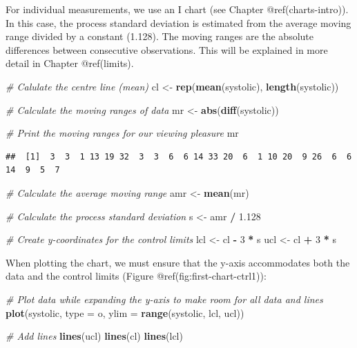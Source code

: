 \documentclass[
]{book}
\newenvironment{Shaded}{\begin{snugshade}}{\end{snugshade}}
\newcommand{\AttributeTok}[1]{\textcolor[rgb]{0.13,0.29,0.53}{#1}}
\newcommand{\CommentTok}[1]{\textcolor[rgb]{0.56,0.35,0.01}{\textit{#1}}}
\newcommand{\DecValTok}[1]{\textcolor[rgb]{0.00,0.00,0.81}{#1}}
\newcommand{\FloatTok}[1]{\textcolor[rgb]{0.00,0.00,0.81}{#1}}
\newcommand{\FunctionTok}[1]{\textcolor[rgb]{0.13,0.29,0.53}{\textbf{#1}}}
\newcommand{\NormalTok}[1]{#1}
\newcommand{\OtherTok}[1]{\textcolor[rgb]{0.56,0.35,0.01}{#1}}
\newcommand{\SpecialCharTok}[1]{\textcolor[rgb]{0.81,0.36,0.00}{\textbf{#1}}}
\newcommand{\StringTok}[1]{\textcolor[rgb]{0.31,0.60,0.02}{#1}}
\begin{document}
For individual measurements, we use an I chart (see Chapter
@ref(charts-intro)). In this case, the process standard deviation is
estimated from the average moving range divided by a constant (1.128).
The moving ranges are the absolute differences between consecutive
observations. This will be explained in more detail in Chapter
@ref(limits).

\begin{Shaded}
\begin{Highlighting}[]
\CommentTok{\# Calulate the centre line (mean)}
\NormalTok{cl  }\OtherTok{\textless{}{-}} \FunctionTok{rep}\NormalTok{(}\FunctionTok{mean}\NormalTok{(systolic), }\FunctionTok{length}\NormalTok{(systolic))}

\CommentTok{\# Calculate the moving ranges of data}
\NormalTok{mr }\OtherTok{\textless{}{-}} \FunctionTok{abs}\NormalTok{(}\FunctionTok{diff}\NormalTok{(systolic))}

\CommentTok{\# Print the moving ranges for our viewing pleasure}
\NormalTok{mr}
\end{Highlighting}
\end{Shaded}

\begin{verbatim}
##  [1]  3  3  1 13 19 32  3  3  6  6 14 33 20  6  1 10 20  9 26  6  6 14  9  5  7
\end{verbatim}

\begin{Shaded}
\begin{Highlighting}[]
\CommentTok{\# Calculate the average moving range}
\NormalTok{amr }\OtherTok{\textless{}{-}} \FunctionTok{mean}\NormalTok{(mr)}

\CommentTok{\# Calculate the process standard deviation}
\NormalTok{s }\OtherTok{\textless{}{-}}\NormalTok{ amr }\SpecialCharTok{/} \FloatTok{1.128}

\CommentTok{\# Create y{-}coordinates for the control limits}
\NormalTok{lcl }\OtherTok{\textless{}{-}}\NormalTok{ cl }\SpecialCharTok{{-}} \DecValTok{3} \SpecialCharTok{*}\NormalTok{ s}
\NormalTok{ucl }\OtherTok{\textless{}{-}}\NormalTok{ cl }\SpecialCharTok{+} \DecValTok{3} \SpecialCharTok{*}\NormalTok{ s}
\end{Highlighting}
\end{Shaded}

When plotting the chart, we must ensure that the y-axis accommodates
both the data and the control limits (Figure
@ref(fig:first-chart-ctrl1)):

\begin{Shaded}
\begin{Highlighting}[]
\CommentTok{\# Plot data while expanding the y{-}axis to make room for all data and lines}
\FunctionTok{plot}\NormalTok{(systolic, }\AttributeTok{type =} \StringTok{\textquotesingle{}o\textquotesingle{}}\NormalTok{, }\AttributeTok{ylim =} \FunctionTok{range}\NormalTok{(systolic, lcl, ucl))}

\CommentTok{\# Add lines}
\FunctionTok{lines}\NormalTok{(ucl)}
\FunctionTok{lines}\NormalTok{(cl)}
\FunctionTok{lines}\NormalTok{(lcl)}
\end{Highlighting}
\end{Shaded}
\end{document}
